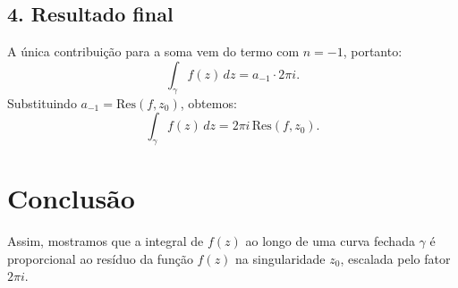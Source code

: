 \documentclass[a4paper,12pt]{article}
\begin{document}
\subsection*{4. Resultado final}
A única contribuição para a soma vem do termo com $n = -1$, portanto:
\[
\int_{\gamma} f(z) \, dz = a_{-1} \cdot 2\pi i.
\]
Substituindo $a_{-1} = \text{Res}(f, z_0)$, obtemos:
\[
\int_{\gamma} f(z) \, dz = 2\pi i \, \text{Res}(f, z_0).
\]

\section*{Conclusão}
Assim, mostramos que a integral de $f(z)$ ao longo de uma curva fechada $\gamma$ é proporcional ao resíduo da função $f(z)$ na singularidade $z_0$, escalada pelo fator $2\pi i$.
\end{document}
